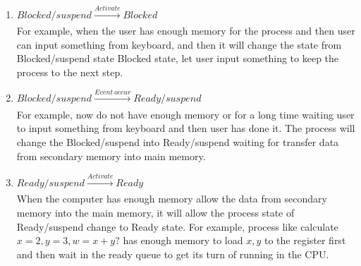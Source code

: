 \documentclass[12pt]{article}
\newenvironment{sol}[1][Solution]{\begin{trivlist}\item[\hskip\labelsep {\bfseries #1:}]}{\end{trivlist}}
\begin{document}
\begin{enumerate}
\begin{sol}
\begin{enumerate}
    \item $Blocked/suspend \xrightarrow[]{Activate} Blocked$\\
    For example, when the user has enough memory for the process and then user can input something from keyboard, and then it will change the state from Blocked/suspend state Blocked state, let user input something to keep the process to the next step. 
    \item $Blocked/suspend \xrightarrow[]{Event \ occur} Ready/suspend$\\
    For example, now do not have enough memory or for a long time waiting user to input something from keyboard and then user has done it. The process will change the Blocked/suspend into Ready/suspend waiting for transfer data from secondary memory into main memory.
    \item $Ready/suspend \xrightarrow[]{Activate} Ready$\\
    When the computer has enough memory allow the data from secondary memory into the main memory, it will allow the process state of Ready/suspend change to Ready state. For example, process like calculate $x=2, y= 3, w = x + y?$ has enough memory to load  $x, y$ to the register first and then wait in the ready queue to get its turn of running in the CPU.
    
    
\end{enumerate}


\end{sol}
\end{enumerate}
\end{document}
